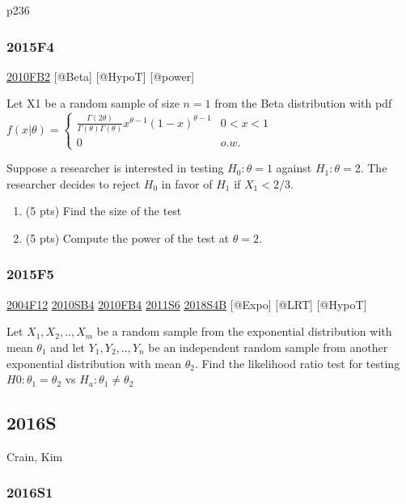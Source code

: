 \documentclass[6pt,twocolumn,Portrait]{article}
\begin{document}
p236

\hypertarget{f4-5}{%
\subsubsection{2015F4}\label{f4-5}}

\protect\hyperlink{fb2-1}{2010FB2} {[}@Beta{]} {[}@HypoT{]} {[}@power{]}

Let X1 be a random sample of size \(n=1\) from the Beta distribution
with pdf
\(f(x|\theta)=\begin{cases}\frac{\Gamma(2\theta)}{\Gamma(\theta)\Gamma(\theta)}x^{\theta-1}(1-x)^{\theta-1}&0<x<1\\0&o.w.\end{cases}\)

Suppose a researcher is interested in testing \(H_0:\theta=1\) against
\(H_1:\theta=2\). The researcher decides to reject \(H_0\) in favor of
\(H_1\) if \(X_1<2/3\).

\begin{enumerate}
\def\labelenumi{(\alph{enumi})}
\item
  (5 pts) Find the size of the test
\item
  (5 pts) Compute the power of the test at \(\theta=2\).
\end{enumerate}

\hypertarget{f5-5}{%
\subsubsection{2015F5}\label{f5-5}}

\protect\hyperlink{f12}{2004F12} \protect\hyperlink{sb4}{2010SB4}
\protect\hyperlink{fb4-1}{2010FB4} \protect\hyperlink{s6-2}{2011S6}
\protect\hyperlink{s4b-2}{2018S4B} {[}@Expo{]} {[}@LRT{]} {[}@HypoT{]}

Let \(X_1,X_2,..,X_{m}\) be a random sample from the exponential
distribution with mean \(\theta_1\) and let \(Y_1,Y_2,..,Y_{n}\) be an
independent random sample from another exponential distribution with
mean \(\theta_2\). Find the likelihood ratio test for testing
\(H0:\theta_1=\theta_2\) vs \(H_a:\theta_1\neq\theta_2\)

\hypertarget{s-9}{%
\subsection{2016S}\label{s-9}}

Crain, Kim

\hypertarget{s1-4}{%
\subsubsection{2016S1}\label{s1-4}}
\end{document}
